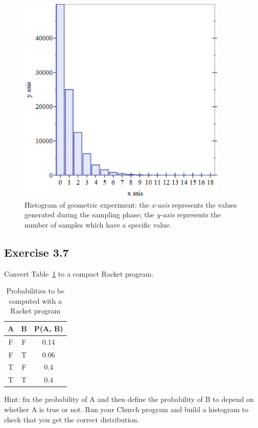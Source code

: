 \begin{figure}[h]
    \centering
    \includegraphics[width=10cm]{images/3.5.png}
    \caption{
        Histogram of geometric experiment: the \textit{x-axis} represents the values generated during the sampling phase; 
        the \textit{y-axis} represents the number of samples which have a specific value.
    }
    \label{fig:3-5}
\end{figure}


\subsection*{Exercise 3.7}
Convert Table~\ref{tab:es3-7} to a compact Racket program.
\begin{table}[h]
    \begin{center}
        \begin{tabular}{ccc}
            \hline
            A & B & P(A, B) \\
            \hline
            F & F & 0.14 \\
            F & T & 0.06 \\
            T & F & 0.4 \\
            T & T & 0.4 \\
            \hline
        \end{tabular}
    \end{center}
    \caption{Probabilities to be computed with a Racket program}
    \label{tab:es3-7}
\end{table}

\noindent Hint: fix the probability of A and then define the probability of B to depend on whether A is true or not. 
Run your Church program and build a histogram to check that you get the correct distribution.

